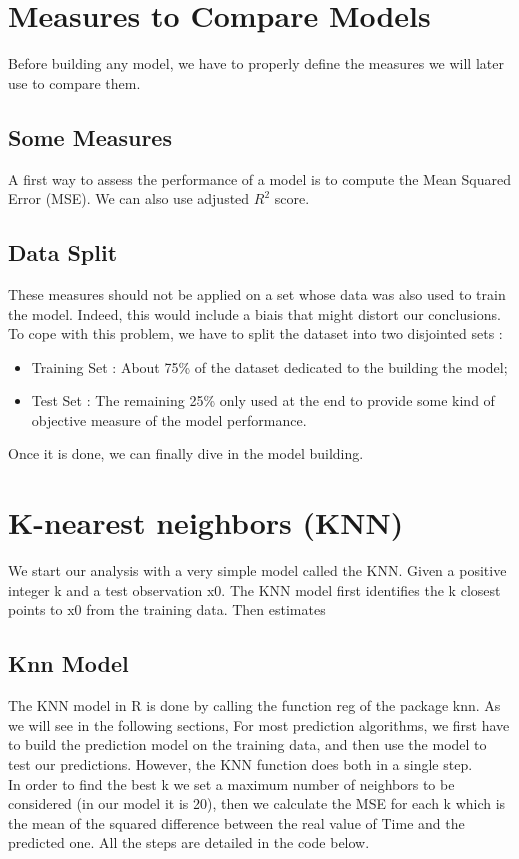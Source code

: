 \documentclass[]{report}
\begin{document}
\section{Measures to Compare Models}
Before building any model, we have to properly define the measures we will later use to compare them. 

\subsection{Some Measures}
A first way to assess the performance of a model is to compute the Mean Squared Error (MSE). We can also use adjusted $R^2$ score.

\subsection{Data Split}
These measures should not be applied on a set whose data was also used to train the model. Indeed, this would include a biais that might distort our conclusions. To cope with this problem, we have to split the dataset into two disjointed sets : 
\begin{itemize}
	\item Training Set : About 75\% of the dataset dedicated to the building the model;
	\item Test Set : The remaining 25\% only used at the end to provide some kind of objective measure of the model performance.
\end{itemize} 

Once it is done, we can finally dive in the model building.

\section{K-nearest neighbors (KNN)}
We start our analysis with a very simple model called the KNN.
Given a positive integer k and a test observation x0. The KNN model first identifies the k closest points to x0 from the training data. Then estimates \\ 

\subsection{Knn Model}
The KNN model in R is done by calling the function reg of the package knn. As we will see in the following sections, For most prediction algorithms, we first have to build the prediction model on the training data, and then use the model to test our predictions. However, the KNN function does both in a single step.\\ 
In order to find the best k we set a maximum number of neighbors to be considered (in our model it is 20), then we calculate the MSE for each k which is the mean of the squared difference between the real value of Time and the predicted one. All the steps are detailed in the code below.
\end{document}
